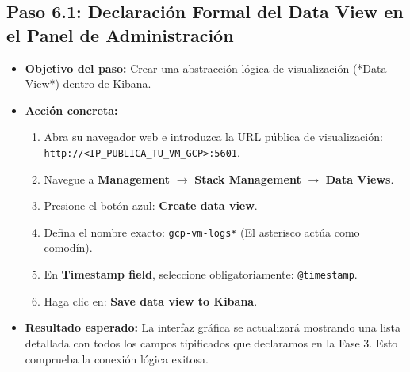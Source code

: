\documentclass[
  coursetitle={Cómputo Nube y Tecnologías Emergentes},
  coursehours={96},
  coursedate={Verano 2026},
  doctype={Práctica},
  otherlangs={english,french},
  authorname={Lázaro},
  authorsurname={Bustio-Martínez},
  authortitle={PhD},
  role={Profesor Investigador},
  email={lbustio@inaoe.mx},
  phone={5559504000},
  ext={7459},
  institution={Instituto Nacional de Astrofísica, Óptica y Electrónica (INAOE)},
  department={Maestría en Ciencias en Tecnologías de Seguridad},
  address={Luis Enrique Erro 1, Sta. Ma. Tonantzintla, San Andrés Cholula, CP 72840, Puebla, México},
  margin={0.5in}
]{../../lbustio_lecture_notes}
\begin{document}
\subsection{Paso 6.1: Declaración Formal del Data View en el Panel de Administración}
\begin{itemize}
    \item \textbf{Objetivo del paso:} Crear una abstracción lógica de visualización (*Data View*) dentro de Kibana.
    \item \textbf{Acción concreta:} 
    \begin{enumerate}
        \item Abra su navegador web e introduzca la URL pública de visualización: \texttt{http://<IP\_PUBLICA\_TU\_VM\_GCP>:5601}.
        \item Navegue a \textbf{Management} $\rightarrow$ \textbf{Stack Management} $\rightarrow$ \textbf{Data Views}.
        \item Presione el botón azul: \textbf{Create data view}.
        \item Defina el nombre exacto: \texttt{gcp-vm-logs*} (El asterisco actúa como comodín).
        \item En \textbf{Timestamp field}, seleccione obligatoriamente: \texttt{@timestamp}.
        \item Haga clic en: \textbf{Save data view to Kibana}.
    \end{enumerate}
    \item \textbf{Resultado esperado:} La interfaz gráfica se actualizará mostrando una lista detallada con todos los campos tipificados que declaramos en la Fase 3. Esto comprueba la conexión lógica exitosa.
\end{itemize}
\end{document}
